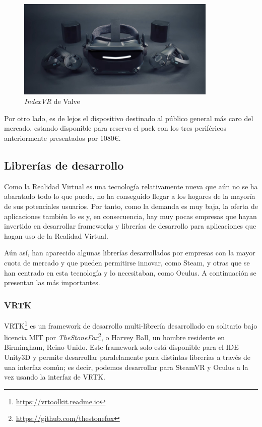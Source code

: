 \begin{figure}[!h]
\begin{center}
    \includegraphics[width=0.85\textwidth]{imagenes/2/indexvr.jpg}
    \caption{\textit{IndexVR} de Valve}
    \label{fig:index-vr}
\end{center}
\end{figure}

Por otro lado, es de lejos el dispositivo destinado al público general más caro del mercado, estando disponible para reserva el pack con los tres periféricos anteriormente presentados por 1080\euro.

\subsection{Librerías de desarrollo}

Como la Realidad Virtual es una tecnología relativamente nueva que aún no se ha abaratado todo lo que puede, no ha conseguido llegar a los hogares de la mayoría de sus potenciales usuarios. Por tanto, como la demanda es muy baja, la oferta de aplicaciones también lo es y, en consecuencia, hay muy pocas empresas que hayan invertido en desarrollar frameworks y librerías de desarrollo para aplicaciones que hagan uso de la Realidad Virtual.

Aún así, han aparecido algunas librerías desarrollados por empresas con la mayor cuota de mercado y que pueden permitirse innovar, como Steam, y otras que se han centrado en esta tecnología y lo necesitaban, como Oculus. A continuación se presentan las más importantes.

\subsubsection{VRTK}

\acl{VRTK}\footnote{\url{https://vrtoolkit.readme.io}} es un framework de desarrollo multi-librería desarrollado en solitario bajo licencia \acs{MIT} por \textit{TheStoneFox}\footnote{\url{https://github.com/thestonefox}}, o Harvey Ball, un hombre residente en Birmingham, Reino Unido. Este framework solo está disponible para el \acs{IDE} Unity3D y permite desarrollar paralelamente para distintas librerías a través de una interfaz común; es decir, podemos desarrollar para SteamVR y Oculus a la vez usando la interfaz de \acs{VRTK}.

